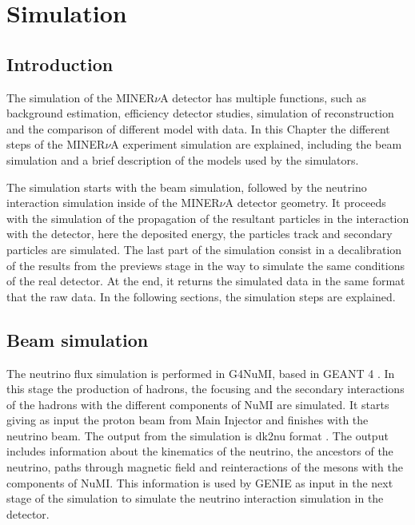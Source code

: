 \chapter{Simulation}
\minitoc
\label{Cap:Simulation}

\section{Introduction}
\label{Cap:Simulation:Introduction}
The simulation of the MINER$\nu$A detector has multiple functions, such as background estimation, efficiency detector studies, simulation of reconstruction and the comparison of different  model with data. In this Chapter the different steps of the MINER$\nu$A experiment simulation are explained, including the beam simulation and a brief description of the models used by the simulators.

The simulation starts with the beam simulation, followed by the neutrino interaction simulation inside of the MINER$\nu$A detector geometry. It proceeds with the simulation of the propagation of the resultant particles in the interaction with the detector, here the deposited energy, the particles track and secondary particles are simulated. The last part of the simulation consist in a decalibration of the results from the previews stage in the way to simulate the same conditions of the real detector. At the end, it returns the simulated data in the same format that the raw data. In the following sections, the simulation steps are explained.

\section{Beam simulation}
\label{Cap:Simulation:BeamSimulation}

The neutrino flux simulation is performed in G4NuMI, based in GEANT 4 \cite{GEANT4}. In this stage the production of hadrons, the focusing and the secondary interactions of the hadrons with the different components of NuMI are simulated. It starts giving as input the proton beam from Main Injector and finishes with the neutrino beam. The output from the simulation is dk2nu format \cite{dk2nu}. The output includes information about the kinematics of the neutrino, the ancestors of the neutrino, paths through magnetic field and reinteractions of the mesons with the components of NuMI. This information is used by GENIE\cite{Genie} as input in the next stage of the simulation to simulate the neutrino interaction simulation in the detector.
 
